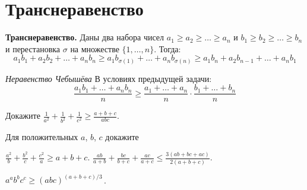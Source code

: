 
\section*{Транснеравенство}

\begin{problems}

\item\textbf{Транснеравенство.}
Даны два набора чисел $a_1 \geq a_2 \geq \ldots \geq a_n$
и $b_1 \geq b_2 \geq \ldots \geq b_n$ и перестановка $\sigma$ на множестве
$\{ 1, \ldots, n \}$.
Тогда:
\[
    a_1 b_1 + a_2 b_2 + \ldots + a_n b_n
\geq
    a_1 b_{\sigma(1)} + \ldots + a_n b_{\sigma(n)}
\geq
    a_1 b_n + a_2 b_{n-1} + \ldots + a_n b_1
\]

\item\emph{Неравенство Чебышёва}
В условиях предыдущей задачи:
\[
    \frac{a_1 b_1 + \ldots + a_n b_n}{n}
\geq
    \frac{a_1 + \ldots + a_n}{n}
    \cdot
    \frac{b_1 + \ldots + b_n}{n}
\]

\item
Докажите
\(\displaystyle
    \frac{1}{a^2} + \frac{1}{b^2} + \frac{1}{c^2}
\geq
    \frac{a + b + c}{abc}
\).

\end{problems}

\vspace{0.5ex}
Для положительных $a$, $b$, $c$ докажите

\begin{problems}

\item
\(\displaystyle
    \frac{a^2}{b} + \frac{b^2}{c} + \frac{c^2}{a}
\geq
    a + b + c
\).
\qquad
\problem
\(\displaystyle
    \frac{a b}{a + b} + \frac{b c}{b + c} + \frac{a c}{a + c}
\leq
    \frac{3 (a b + b c + a c)}{2 (a + b + c)}
\).

\item
\(\displaystyle
    a^a b^b c^c \geq (a b c)^{(a + b + c)/3}
\)\,.

\end{problems}

